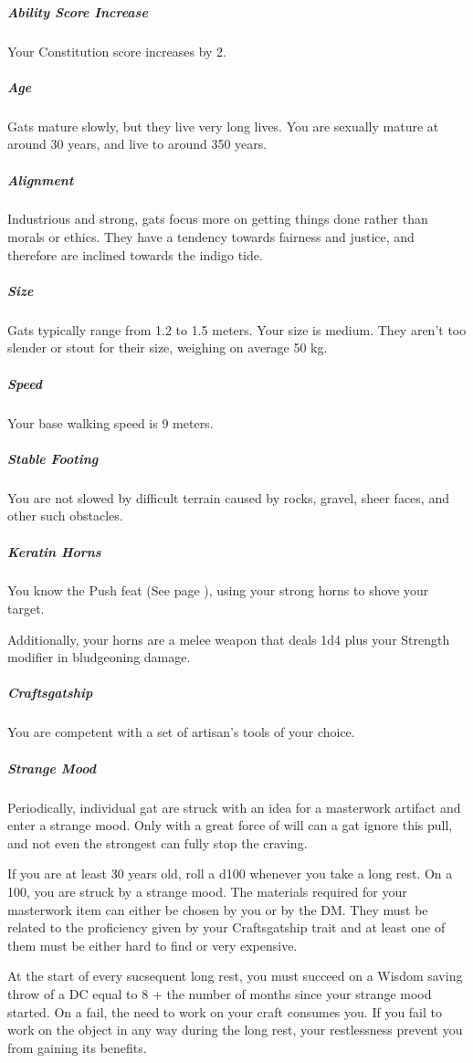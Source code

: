    \subparagraph{Ability Score Increase} Your Constitution score increases by 2.

    \subparagraph{Age} Gats mature slowly, but they live very long lives.
    You are sexually mature at around 30 years, and live to around 350 years.

    \subparagraph{Alignment} Industrious and strong, gats focus more on getting things done rather than morals or ethics.
    They have a tendency towards fairness and justice, and therefore are inclined towards the indigo tide.

    \subparagraph{Size} Gats typically range from 1.2 to 1.5 meters.
    Your size is medium.
    They aren't too slender or stout for their size, weighing on average 50 kg.

    \subparagraph{Speed} Your base walking speed is 9 meters.

    \subparagraph{Stable Footing} You are not slowed by difficult terrain caused by rocks, gravel, sheer faces, and other such obstacles.

    \subparagraph{Keratin Horns} You know the Push feat (See page \pageref{feat::push}), using your strong horns to shove your target.

    Additionally, your horns are a melee weapon that deals 1d4 plus your Strength modifier in bludgeoning damage.

    \subparagraph{Craftsgatship} You are competent with a set of artisan's tools of your choice.

    \subparagraph{Strange Mood} Periodically, individual gat are struck with an idea for a masterwork artifact and enter a strange mood.
    Only with a great force of will can a gat ignore this pull, and not even the strongest can fully stop the craving.

    If you are at least 30 years old, roll a d100 whenever you take a long rest.
    On a 100, you are struck by a strange mood.
    The materials required for your masterwork item can either be chosen by you or by the DM.
    They must be related to the proficiency given by your Craftsgatship trait and at least one of them must be either hard to find or very expensive.

    At the start of every sucsequent long rest, you must succeed on a Wisdom saving throw of a DC equal to 8 + the number of months since your strange mood started.
    On a fail, the need to work on your craft consumes you.
    If you fail to work on the object in any way during the long rest, your restlessness prevent you from gaining its benefits.

